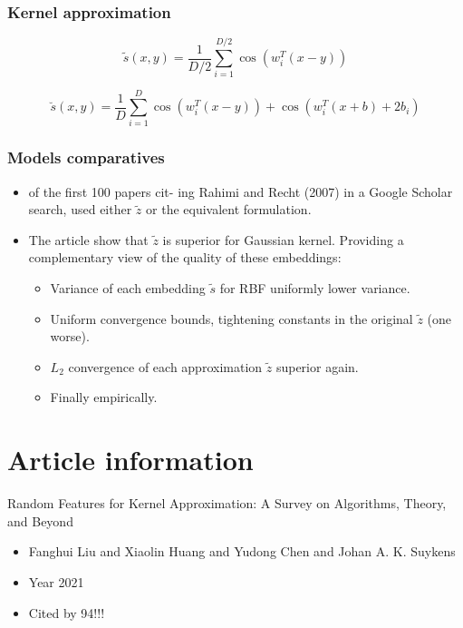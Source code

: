 \begin{frame}
  \frametitle{Kernel approximation}
  \begin{equation}
    \tilde{s}(x,y)
    = 
    \frac{1}{D/2} \sum_{i=1}^{D/2}
    \cos(w_i^T(x-y))
  \end{equation}

  \begin{equation}
    \breve{s}(x,y)
    = 
    \frac{1}{D} \sum_{i=1}^{D}
    \cos(w_i^T(x-y))
    +
    \cos(w_i^T(x+b) + 2b_i)
  \end{equation}
  

\end{frame}

\begin{frame}
  \frametitle{Models comparatives}
\begin{itemize}
  \item of the first 100 papers cit-
  ing Rahimi and Recht (2007) in a Google Scholar search,
  used either  $\tilde{z}$ or the equivalent formulation.
  \item The article show that $\tilde{z}$ is superior for Gaussian kernel. 
  Providing a complementary view of the quality of
these embeddings:
  \begin{itemize}
    \item Variance of each embedding $\tilde{s}$ for RBF uniformly lower variance.
    \item Uniform convergence bounds, tightening constants in the
    original $\tilde{z}$ (one worse).
    \item $L_2$ convergence of each approximation $\tilde{z}$ superior again.
    \item Finally empirically. 
  \end{itemize}
\end{itemize}
  

\end{frame}


\section{Article information}
\begin{frame}{Random Features for Kernel Approximation: A Survey on Algorithms, Theory, and Beyond}
  \begin{itemize}
    \item Fanghui Liu and Xiaolin Huang and Yudong Chen and Johan A. K. Suykens
    \item Year 2021
    \item Cited by 94!!!
  \end{itemize}
  \cite{liu2021random}
 
\end{frame}


